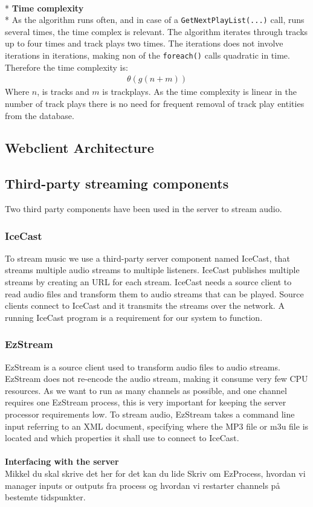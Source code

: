 \documentclass[a4paper,11pt,report]{article}
\begin{document}
\textbf{ } \\*
\textbf{Time complexity} \\*
As the algorithm runs often, and in case of a \texttt{GetNextPlayList(...)} call, runs several times, the time complex is relevant. The algorithm iterates through tracks up to four times and track plays two times. The iterations does not involve iterations in iterations, making non of the \texttt{foreach()} calls quadratic in time. Therefore the time complexity is: 
\begin{align*}
\theta (g(n + m))
\end{align*}
Where \begin{math}n\end{math}, is tracks and \begin{math}m\end{math} is trackplays. As the time complexity is linear in the number of track plays there is no need for frequent removal of track play entities from the database.

\subsection{Webclient Architecture}

\subsection{Third-party streaming components}
Two third party components have been used in the server to stream audio.
\subsubsection{IceCast}
To stream music we use a third-party server component named IceCast\cite{IceCast}, that streams multiple audio streams to multiple listeners. IceCast publishes multiple streams by creating an URL for each stream. IceCast needs a source client to read audio files and transform them to audio streams that can be played. Source clients connect to IceCast and it transmits the streams over the network. A running IceCast program is a requirement for our system to function.
\subsubsection{EzStream}
EzStream\cite{EzStream} is a source client used to transform audio files to audio streams. EzStream does not re-encode the audio stream, making it consume very few CPU resources. As we want to run as many channels as possible, and one channel requires one EzStream process, this is very important for keeping the server processor requirements low. To stream audio, EzStream takes a command line input referring to an XML document, specifying where the MP3 file or m3u file is located and which properties it shall use to connect to IceCast. \\ \\
\textbf{Interfacing with the server} \\
Mikkel du skal skrive det her for det kan du lide
Skriv om EzProcess, hvordan vi manager inputs or outputs fra process og hvordan vi restarter channels på bestemte tidspunkter.
\end{document}

